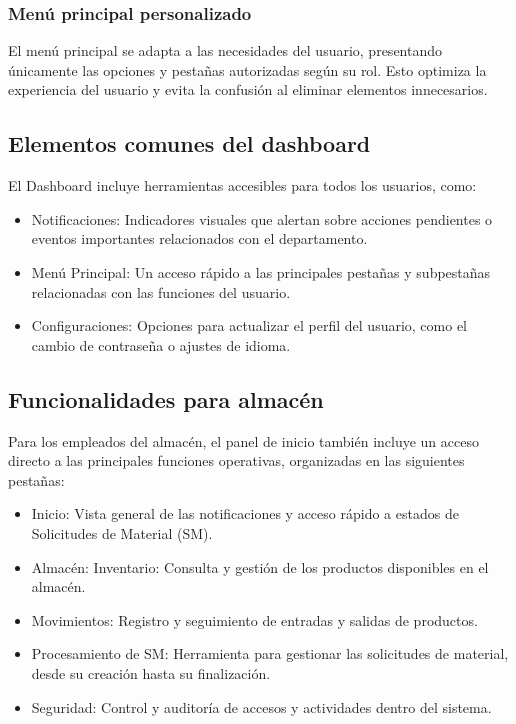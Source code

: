 \subsubsection{Menú principal personalizado}
El menú principal se adapta a las necesidades del usuario, presentando únicamente las opciones y pestañas autorizadas según su rol. Esto optimiza la experiencia del usuario y evita la confusión al eliminar elementos innecesarios. 

\subsection{Elementos comunes del dashboard }

El Dashboard incluye herramientas accesibles para todos los usuarios, como: 

\begin{itemize}
    \item Notificaciones: Indicadores visuales que alertan sobre acciones pendientes o eventos importantes relacionados con el departamento. 
    \item Menú Principal: Un acceso rápido a las principales pestañas y subpestañas relacionadas con las funciones del usuario. 
    \item Configuraciones: Opciones para actualizar el perfil del usuario, como el cambio de contraseña o ajustes de idioma. 
\end{itemize}


\subsection{Funcionalidades para almacén}

Para los empleados del almacén, el panel de inicio también incluye un acceso directo a las principales funciones operativas, organizadas en las siguientes pestañas: 

\begin{itemize}
    \item Inicio: Vista general de las notificaciones y acceso rápido a estados de Solicitudes de Material (SM). 
    \item Almacén: Inventario: Consulta y gestión de los productos disponibles en el almacén. 
    \item Movimientos: Registro y seguimiento de entradas y salidas de productos. 
    \item Procesamiento de SM: Herramienta para gestionar las solicitudes de material, desde su creación hasta su finalización. 
    \item Seguridad: Control y auditoría de accesos y actividades dentro del sistema. 
\end{itemize}

